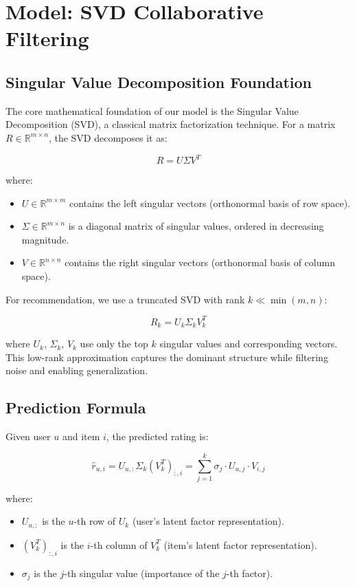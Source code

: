 \section{Model: SVD Collaborative Filtering}
\label{sec:model}

\subsection{Singular Value Decomposition Foundation}

The core mathematical foundation of our model is the Singular Value Decomposition (SVD), a classical 
matrix factorization technique. For a matrix $R \in \mathbb{R}^{m \times n}$, the SVD decomposes it as:

\[
  R = U \Sigma V^T
\]

where:
\begin{itemize}
  \item $U \in \mathbb{R}^{m \times m}$ contains the left singular vectors (orthonormal basis of row space).
  \item $\Sigma \in \mathbb{R}^{m \times n}$ is a diagonal matrix of singular values, ordered in decreasing magnitude.
  \item $V \in \mathbb{R}^{n \times n}$ contains the right singular vectors (orthonormal basis of column space).
\end{itemize}

For recommendation, we use a truncated SVD with rank $k \ll \min(m, n)$:

\[
  R_k = U_k \Sigma_k V_k^T
\]

where $U_k$, $\Sigma_k$, $V_k$ use only the top $k$ singular values and corresponding vectors. This low-rank 
approximation captures the dominant structure while filtering noise and enabling generalization.

\subsection{Prediction Formula}

Given user $u$ and item $i$, the predicted rating is:

\[
  \hat{r}_{u,i} = U_{u,:} \Sigma_k (V_k^T)_{:,i} = \sum_{j=1}^{k} \sigma_j \cdot U_{u,j} \cdot V_{i,j}
\]

where:
\begin{itemize}
  \item $U_{u,:}$ is the $u$-th row of $U_k$ (user's latent factor representation).
  \item $(V_k^T)_{:,i}$ is the $i$-th column of $V_k^T$ (item's latent factor representation).
  \item $\sigma_j$ is the $j$-th singular value (importance of the $j$-th factor).
\end{itemize}

